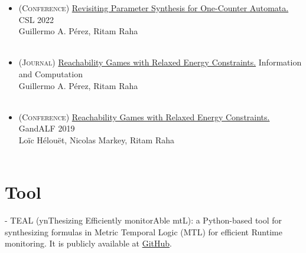 \documentclass[a4paper,10pt]{article}
\begin{document}
\begin{itemize}
    \item \textsc{(Conference)} \href{https://drops.dagstuhl.de/entities/document/10.4230/LIPIcs.CSL.2022.33}{Revisiting Parameter Synthesis for One-Counter Automata.} CSL 2022\\
    Guillermo A. P\'erez, Ritam Raha\\
    \\
    
    \item \textsc{(Journal)} \href{https://www.sciencedirect.com/science/article/abs/pii/S089054012100122X}{Reachability Games with Relaxed Energy Constraints.} Information and Computation \\
    Guillermo A. P\'erez, Ritam Raha\\
    \\
    
    
    \item \textsc{(Conference)} \href{https://arxiv.org/abs/1909.07653v1}{Reachability Games with Relaxed Energy Constraints.} GandALF 2019\\
    Loïc Hélouët, Nicolas Markey, Ritam Raha\\
    \\
\end{itemize} 


\section{Tool}
- \textsc{TEAL} (ynThesizing Efficiently monitorAble mtL): a Python-based tool for synthesizing formulas in Metric Temporal Logic (MTL) for efficient Runtime monitoring. It is publicly available at \href{https://github.com/ritamraha/Teal}{GitHub}.\\
\end{document}
